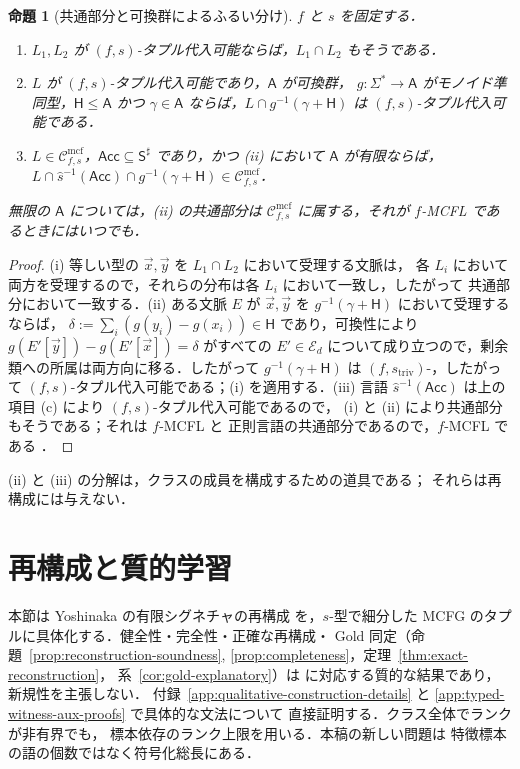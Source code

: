 \documentclass[11pt,a4paper]{ltjsarticle}
\numberwithin{equation}{section}
\theoremstyle{plain}
\newtheorem{proposition}[theorem]{命題}
\theoremstyle{definition}
\theoremstyle{remark}
\newcommand{\Cmcf}[2]{\mathcal{C}^{\mathrm{mcf}}_{#1,#2}}
\newcommand{\tuple}[1]{\vec{#1}}
\theoremstyle{plain}
\begin{document}
\begin{proposition}[共通部分と可換群によるふるい分け]
\label{prop:abelian-coset-filter}
$f$ と $s$ を固定する．
\begin{enumerate}[label=(\roman*),leftmargin=*]
\item $L_1,L_2$ が $(f,s)$-タプル代入可能ならば，$L_1\cap L_2$ もそうである．
\item $L$ が $(f,s)$-タプル代入可能であり，$\mathsf A$ が可換群，
$g:\Sigma^*\to\mathsf A$ がモノイド準同型，$\mathsf H\le\mathsf A$ かつ
$\gamma\in\mathsf A$ ならば，$L\cap g^{-1}(\gamma+\mathsf H)$ は
$(f,s)$-タプル代入可能である．
\item $L\in\Cmcf{f}{s}$，$\mathsf{Acc}\subseteq\mathsf S^\sharp$ であり，かつ (ii) において
$\mathsf A$ が有限ならば，
$L\cap\widehat{s}^{-1}(\mathsf{Acc})\cap g^{-1}(\gamma+\mathsf H)\in\Cmcf{f}{s}$．
\end{enumerate}
無限の $\mathsf A$ については，(ii) の共通部分は
$\Cmcf{f}{s}$ に属する，それが $f$-MCFL であるときにはいつでも．
\end{proposition}

\begin{proof}
(i) 等しい型の $\tuple x,\tuple y$ を $L_1\cap L_2$ において受理する文脈は，
各 $L_i$ において両方を受理するので，それらの分布は各 $L_i$ において一致し，したがって
共通部分において一致する．(ii) ある文脈 $E$ が
$\tuple x,\tuple y$ を $g^{-1}(\gamma+\mathsf H)$ において受理するならば，
$\delta:=\sum_i(g(y_i)-g(x_i))\in\mathsf H$ であり，可換性により
$g(E'[\tuple y])-g(E'[\tuple x])=\delta$ がすべての
$E'\in\mathcal E_d$ について成り立つので，剰余類への所属は両方向に移る．したがって
$g^{-1}(\gamma+\mathsf H)$ は $(f,s_{\mathrm{triv}})$-，したがって
$(f,s)$-タプル代入可能である；(i) を適用する．(iii) 言語
$\widehat{s}^{-1}(\mathsf{Acc})$ は上の項目 (c) により $(f,s)$-タプル代入可能であるので，
(i) と (ii) により共通部分もそうである；それは $f$-MCFL と
正則言語の共通部分であるので，$f$-MCFL である \cite{SekiEtAl1991}．
\end{proof}

(ii) と (iii) の分解は，クラスの成員を構成するための道具である；
それらは再構成には与えない．

\section{再構成と質的学習}
\label{sec:learner}

本節は Yoshinaka の有限シグネチャの再構成
\cite{Yoshinaka2015General} を，$s$-型で細分した
MCFG のタプルに具体化する．健全性・完全性・正確な再構成・
Gold 同定（命題~\ref{prop:reconstruction-soundness},
\ref{prop:completeness}，定理~\ref{thm:exact-reconstruction}，
系~\ref{cor:gold-explanatory}）は
\cite[Lemmas~2--3 and Theorem~1]{Yoshinaka2015General}
に対応する質的な結果であり，新規性を主張しない．
付録~\ref{app:qualitative-construction-details} と
\ref{app:typed-witness-aux-proofs} で具体的な文法について
直接証明する．クラス全体でランクが非有界でも，
標本依存のランク上限を用いる．本稿の新しい問題は
特徴標本の語の個数ではなく符号化総長にある．
\end{document}
